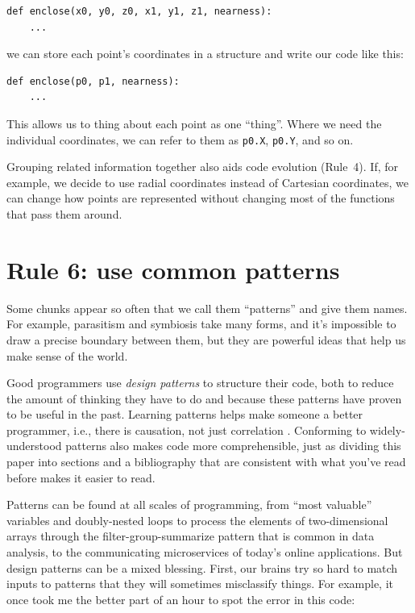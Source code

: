 \documentclass[10pt,letterpaper]{article}
\begin{document}
\begin{lstlisting}
def enclose(x0, y0, z0, x1, y1, z1, nearness):
    ...
\end{lstlisting}

\noindent
we can store each point's coordinates in a structure
and write our code like this:

\begin{lstlisting}
def enclose(p0, p1, nearness):
    ...
\end{lstlisting}

\noindent
This allows us to thing about each point as one ``thing''.
Where we need the individual coordinates,
we can refer to them as \texttt{p0.X}, \texttt{p0.Y}, and so on.

Grouping related information together also aids code evolution (Rule~4).
If, for example, we decide to use radial coordinates instead of Cartesian coordinates,
we can change how points are represented without changing most of the functions that pass them around.

\section*{Rule 6: use common patterns}

Some chunks appear so often that we call them ``patterns'' and give them names.
For example,
parasitism and symbiosis take many forms,
and it's impossible to draw a precise boundary between them,
but they are powerful ideas that help us make sense of the world.

Good programmers use \emph{design patterns} to structure their code,
both to reduce the amount of thinking they have to do
and because these patterns have proven to be useful in the past.
Learning patterns helps make someone a better programmer,
i.e.,
there is causation, not just correlation \cite{Tichy2010}.
Conforming to widely-understood patterns also makes code more comprehensible,
just as dividing this paper into sections and a bibliography
that are consistent with what you've read before
makes it easier to read.

Patterns can be found at all scales of programming,
from ``most valuable'' variables \cite{Byckling2005}
and doubly-nested loops to process the elements of two-dimensional arrays
through the filter-group-summarize pattern that is common in data analysis,
to the communicating microservices of today's online applications.
But design patterns can be a mixed blessing.
First,
our brains try so hard to match inputs to patterns that they will sometimes misclassify things.
For example,
it once took me the better part of an hour to spot the error in this code:
\end{document}
